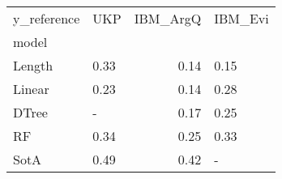 \begin{tabular}{llrl}
\toprule
y\_reference &   UKP &  IBM\_ArgQ & IBM\_Evi \\
model  &       &           &         \\
\midrule
Length &  0.33 &      0.14 &    0.15 \\
Linear &  0.23 &      0.14 &    0.28 \\
DTree  &     - &      0.17 &    0.25 \\
RF     &  0.34 &      0.25 &    0.33 \\
SotA   &  0.49 &      0.42 &       - \\
\bottomrule
\end{tabular}
